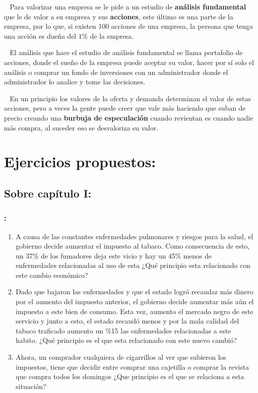 \documentclass[
  letterpaper,
  DIV=11,
  numbers=noendperiod]{scrreport}
\providecommand{\tightlist}{%
  \setlength{\itemsep}{0pt}\setlength{\parskip}{0pt}}\usepackage{longtable,booktabs,array}
\begin{document}
~ Para valorizar una empresa se le pide a un estudio de \textbf{análisis
fundamental} que le de valor a su empresa y sus \textbf{acciones}, este
último es una parte de la empresa, por lo que, si existen 100 acciones
de una empresa, la persona que tenga una acción es dueña del \(1\%\) de
la empresa.

~ El análisis que hace el estudio de análisis fundamental se llama
portafolio de acciones, donde el sueño de la empresa puede aceptar su
valor, hacer por sí solo el análisis o comprar un fondo de inversiones
con un administrador donde el administrador lo analice y tome las
decisiones.

~ En un principio los valores de la oferta y demanda determinan el valor
de estas acciones, pero a veces la gente puede creer que vale más
haciendo que suban de precio creando una \textbf{burbuja de
especulación} cuando revientan es cuando nadie más compra, al suceder
eso se desvaloriza su valor.


\hypertarget{ejercicios-propuestos}{%
\chapter{Ejercicios propuestos:}\label{ejercicios-propuestos}}

\hypertarget{sobre-capuxedtulo-i}{%
\section{Sobre capítulo I:}\label{sobre-capuxedtulo-i}}

\hypertarget{section}{%
\subsection{:}\label{section}}

\begin{enumerate}
\def\labelenumi{\arabic{enumi})}
\tightlist
\item
  A causa de las constantes enfermedades pulmonares y riesgos para la
  salud, el gobierno decide aumentar el impuesto al tabaco. Como
  consecuencia de esto, un 37\% de los fumadores deja este vicio y hay
  un 45\% menos de enfermedades relacionadas al uso de esta ¿Qué
  principio esta relacionado con este cambio económico?
\item
  Dado que bajaron las enfermedades y que el estado logró recaudar más
  dinero por el aumento del impuesto anterior, el gobierno decide
  aumentar más aún el impuesto a este bien de consumo. Esta vez, aumento
  el mercado negro de este servicio y junto a esto, el estado recaudó
  menos y por la mala calidad del tabaco traficado aumento un \%15 las
  enfermedades relacionadas a este habito. ¿Qué principio es el que esta
  relacionado con este nuevo cambió?
\item
  Ahora, un comprador cualquiera de cigarrillos al ver que subieron los
  impuestos, tiene que decidir entre comprar una cajetilla o comprar la
  revista que compra todos los domingos ¿Que principio es el que se
  relaciona a esta situación?
\end{enumerate}
\end{document}
